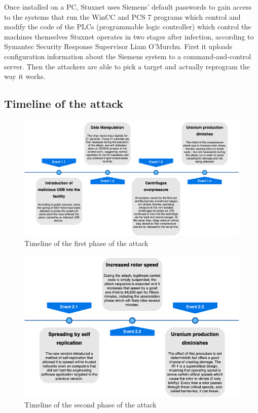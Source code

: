 \documentclass[12pt]{article}
\begin{document}
Once installed on a PC, Stuxnet uses Siemens' default passwords to gain access to the systems that run the WinCC and PCS 7 programs which control and modify the code of the PLCs (programmable logic controller) which control the machines themselves Stuxnet operates in two stages after infection, according to Symantec Security Response Supervisor Liam O'Murchu. First it uploads configuration information about the Siemens system to a command-and-control server. Then the attackers are able to pick a target and actually reprogram the way it works. \cite{siemens}

\subsection{Timeline of the attack}
    \begin{figure}[H]
    \centering
    \includegraphics[width=\textwidth]{time1.png}
    \caption{Timeline of the first phase of the attack}
    \label{fig:time1}
    \end{figure}
    
     \begin{figure}[H]
    \centering
    \includegraphics[width=\textwidth]{time2.png}
    \caption{Timeline of the second phase of the attack}
    \label{fig:time2}
    \end{figure}
\end{document}
